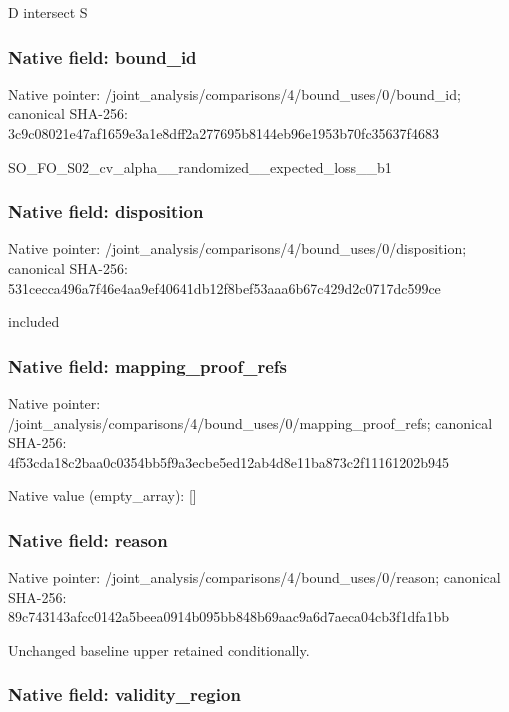 \documentclass[10pt,a4paper]{article}
\begin{document}
D intersect S


\subsubsection{Native field: bound\_id}


Native pointer: /joint\_analysis/comparis\allowbreak{}ons/4/bound\_uses/0/bound\allowbreak{}\_id; canonical SHA-256: 3c9c08021e47af1659e3a1e8\allowbreak{}dff2a277695b8144eb96e195\allowbreak{}3b70fc35637f4683


SO\_FO\_S02\_cv\_alpha\_\_rand\allowbreak{}omized\_\_expected\_loss\_\_b\allowbreak{}1


\subsubsection{Native field: disposition}


Native pointer: /joint\_analysis/comparis\allowbreak{}ons/4/bound\_uses/0/dispo\allowbreak{}sition; canonical SHA-256: 531cecca496a7f46e4aa9ef4\allowbreak{}0641db12f8bef53aaa6b67c4\allowbreak{}29d2c0717dc599ce


included


\subsubsection{Native field: mapping\_proof\_refs}


Native pointer: /joint\_analysis/comparis\allowbreak{}ons/4/bound\_uses/0/mappi\allowbreak{}ng\_proof\_refs; canonical SHA-256: 4f53cda18c2baa0c0354bb5f\allowbreak{}9a3ecbe5ed12ab4d8e11ba87\allowbreak{}3c2f11161202b945



Native value (empty\_array): []



\subsubsection{Native field: reason}


Native pointer: /joint\_analysis/comparis\allowbreak{}ons/4/bound\_uses/0/reaso\allowbreak{}n; canonical SHA-256: 89c743143afcc0142a5beea0\allowbreak{}914b095bb848b69aac9a6d7a\allowbreak{}eca04cb3f1dfa1bb


Unchanged baseline upper retained conditionally.


\subsubsection{Native field: validity\_region}
\end{document}
